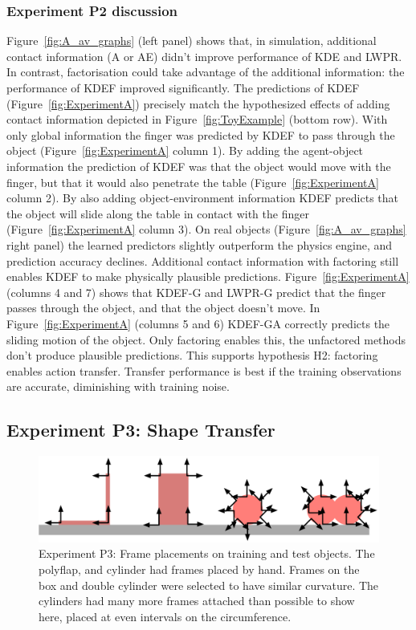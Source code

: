 \subsubsection{Experiment P2 discussion} 
Figure~\ref{fig:A_av_graphs} (left panel) shows that, in simulation, additional contact information (A or AE) didn't improve performance of KDE and LWPR. In contrast, factorisation could take advantage of the additional information: the performance of KDEF improved significantly. The predictions of KDEF (Figure~\ref{fig:ExperimentA}) precisely match the hypothesized
effects of adding contact information depicted in Figure~\ref{fig:ToyExample} (bottom row). With only global information the finger was predicted by KDEF to pass through the object (Figure~\ref{fig:ExperimentA} column 1). By adding the agent-object information the prediction of KDEF was that the object would move with the finger, but that it would also penetrate the table (Figure~\ref{fig:ExperimentA} column 2). By also adding object-environment information KDEF predicts that the object will slide along the table in contact with the finger (Figure~\ref{fig:ExperimentA} column 3). On real objects (Figure~\ref{fig:A_av_graphs} right panel) the learned predictors slightly outperform the physics engine, and prediction accuracy declines. Additional contact information with factoring still enables KDEF to make physically plausible predictions. Figure~\ref{fig:ExperimentA} (columns 4 and 7) shows that KDEF-G and LWPR-G predict that the finger passes through the object, and that the object doesn't move. In Figure~\ref{fig:ExperimentA} (columns 5 and 6) KDEF-GA correctly predicts the sliding motion of the object. Only factoring enables this, the unfactored methods don't produce plausible predictions. This supports hypothesis H2: factoring enables action transfer. Transfer performance is best if the training observations are accurate, diminishing with training noise. 

\subsection{Experiment P3:  Shape Transfer}\label{sec:Results.Shape}

\begin{figure}[t]
\centerline{\includegraphics[width=0.99\columnwidth]{./frame-placements}}
\caption{\label{fig:frame-transfer} Experiment P3: Frame placements on training and test objects. The polyflap, and cylinder had frames placed by hand. Frames on the box and double cylinder were selected to have similar curvature. The cylinders had many more frames attached than possible to show here, placed at even intervals on the circumference.}
\end{figure}


